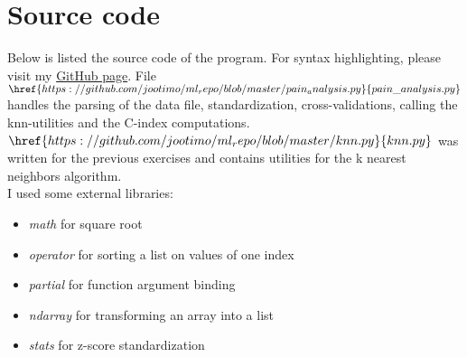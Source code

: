 \documentclass[a4paper]{article}
\begin{document}
\section{Source code}
Below is listed the source code of the program. For syntax highlighting, please visit my \href{https://github.com/jootimo/ml_repo}{GitHub page}. File $\href{https://github.com/jootimo/ml_repo/blob/master/pain_analysis.py}{pain\_analysis.py}$ handles the parsing of the data file, standardization, cross-validations, calling the knn-utilities and the C-index computations. $\href{https://github.com/jootimo/ml_repo/blob/master/knn.py}{knn.py}$ was written for the previous exercises and contains utilities for the k nearest neighbors algorithm.\\

I used some external libraries:
\begin{itemize}
\item \emph{math} for square root
\item \emph{operator} for sorting a list on values of one index
\item \emph{partial} for function argument binding
\item \emph{ndarray} for transforming an array into a list
\item \emph{stats} for z-score standardization
\end{itemize}

\vspace*{1cm}

\renewcommand{\sfdefault}{pcr}
\selectfont
\end{document}
